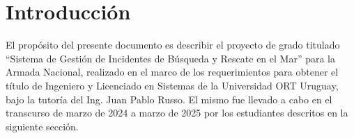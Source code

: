 \chapter{Introducción}\label{ch:introduccion}

El propósito del presente documento es describir el proyecto de grado titulado “Sistema de Gestión de Incidentes de Búsqueda y Rescate en el Mar” para la Armada Nacional, realizado en el marco de los requerimientos para obtener el título de Ingeniero y Licenciado en Sistemas de la Universidad ORT Uruguay, bajo la tutoría del Ing. Juan Pablo Russo. El mismo fue llevado a cabo en el transcurso de marzo de 2024 a marzo de 2025 por los estudiantes descritos en la siguiente sección. 


